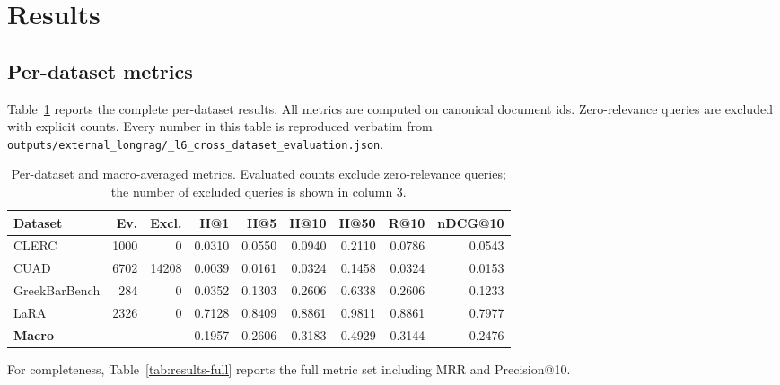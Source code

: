 \documentclass[11pt,a4paper]{article}
\begin{document}
\section{Results}\label{sec:results}

\subsection{Per-dataset metrics}
Table~\ref{tab:results} reports the complete per-dataset results. All
metrics are computed on canonical document ids. Zero-relevance
queries are excluded with explicit counts. Every number in this table
is reproduced verbatim from
\texttt{outputs/external\_longrag/\_l6\_cross\_dataset\_evaluation.json}.

\begin{table}[h]
\centering
\caption{Per-dataset and macro-averaged metrics. Evaluated counts
exclude zero-relevance queries; the number of excluded queries is
shown in column 3.}
\label{tab:results}
\small
\begin{tabular}{l r r r r r r r r}
\toprule
\textbf{Dataset} & \textbf{Ev.} & \textbf{Excl.}
  & \textbf{H@1} & \textbf{H@5} & \textbf{H@10} & \textbf{H@50}
  & \textbf{R@10} & \textbf{nDCG@10} \\
\midrule
CLERC              & \num{1000} & \num{0}
  & \num{0.0310} & \num{0.0550} & \num{0.0940} & \num{0.2110}
  & \num{0.0786} & \num{0.0543} \\
CUAD               & \num{6702} & \num{14208}
  & \num{0.0039} & \num{0.0161} & \num{0.0324} & \num{0.1458}
  & \num{0.0324} & \num{0.0153} \\
GreekBarBench      & \num{284}  & \num{0}
  & \num{0.0352} & \num{0.1303} & \num{0.2606} & \num{0.6338}
  & \num{0.2606} & \num{0.1233} \\
LaRA               & \num{2326} & \num{0}
  & \num{0.7128} & \num{0.8409} & \num{0.8861} & \num{0.9811}
  & \num{0.8861} & \num{0.7977} \\
\midrule
\textbf{Macro}     & --- & ---
  & \num{0.1957} & \num{0.2606} & \num{0.3183} & \num{0.4929}
  & \num{0.3144} & \num{0.2476} \\
\bottomrule
\end{tabular}
\end{table}

For completeness, Table~\ref{tab:results-full} reports the full
metric set including MRR and Precision@10.
\end{document}
